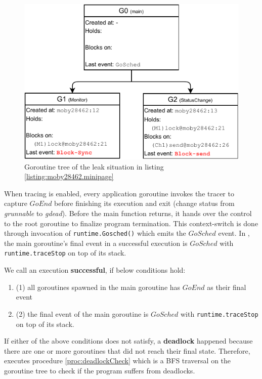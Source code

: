 \begin{figure}[]
\centering
\includegraphics[width=0.75\linewidth]{figs/gtree.pdf}
\caption{Goroutine tree of the leak situation in listing \ref{listing:moby28462.minipage}}
\label{fig:gtree}
\end{figure}

When tracing is enabled, every application goroutine invokes the tracer to capture $GoEnd$ before finishing its execution and exit (\ie change status from \textit{grunnable} to \textit{gdead}\cite{goexit-line-of-code}).
%
Before the main function returns, it hands over the control to the root goroutine to finalize program termination.
%
This context-switch is done through invocation of \texttt{runtime.Gosched()} which emits the $GoSched$ event.
%
In \goat, the main goroutine's final event in a successful execution is $GoSched$ with \texttt{runtime.traceStop} on top of its stack.
%

We call an execution \textbf{successful}, if below conditions hold:
\begin{enumerate}
  \item (1) all goroutines spawned in the main goroutine has $GoEnd$ as their final event
  \item (2) the final event of the main goroutine is $GoSched$ with \texttt{runtime.traceStop} on top of its stack.
\end{enumerate}
If either of the above conditions does not satisfy, a \textbf{deadlock} happened because there are one or more goroutines that did not reach their final state. Therefore, \goat executes procedure \ref{proc:deadlockCheck} which is a BFS traversal on the goroutine tree to check if the program suffers from deadlocks.

